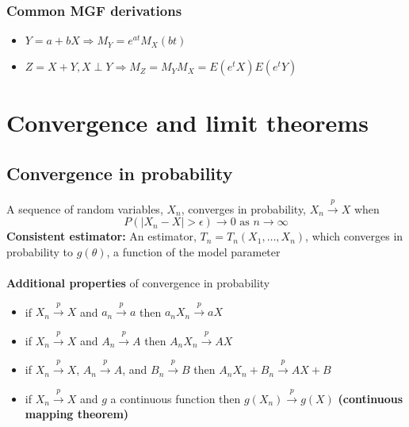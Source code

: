 \documentclass{article}
\newcommand{\abs}[1]{\lvert#1\rvert}
\begin{document}
\subsubsection{Common MGF derivations}
\begin{itemize}
    \item $Y = a+bX \Longrightarrow M_Y = e^{at}M_X(bt)$
    \item $Z = X+Y, X \perp Y \Longrightarrow M_Z = M_YM_X = E(e^tX)E(e^tY)$
\end{itemize}


\section{Convergence and limit theorems}
\subsection{Convergence in probability}
A sequence of random variables, $X_n$, converges in probability, $X_n \overset{p}{\longrightarrow} X$ when
\begin{equation*}
    P(\abs{X_n - X} > \epsilon) \longrightarrow 0 \textrm{ as } n \longrightarrow \infty
\end{equation*}
\textbf{Consistent estimator:} An estimator, $T_n = T_n(X_1, \dots, X_n)$, which converges in probability to $g(\theta)$, a function of the model parameter\\\\
\textbf{Additional properties} of convergence in probability
\begin{itemize}
    \item if $X_n \overset{p}{\longrightarrow} X$ and $a_n \overset{p}{\longrightarrow} a$ then $a_nX_n \overset{p}{\longrightarrow} aX$
    \item if $X_n \overset{p}{\longrightarrow} X$ and $A_n \overset{p}{\longrightarrow} A$ then $A_nX_n \overset{p}{\longrightarrow} AX$
    \item if $X_n \overset{p}{\longrightarrow} X$, $A_n \overset{p}{\longrightarrow} A$, and $B_n \overset{p}{\longrightarrow} B$ then $A_nX_n + B_n \overset{p}{\longrightarrow} AX + B$
    \item if $X_n \overset{p}{\longrightarrow} X$ and $g$ a continuous function then $g(X_n) \overset{p}{\longrightarrow} g(X)$ \textbf{(continuous mapping theorem)}
\end{itemize}
\end{document}
